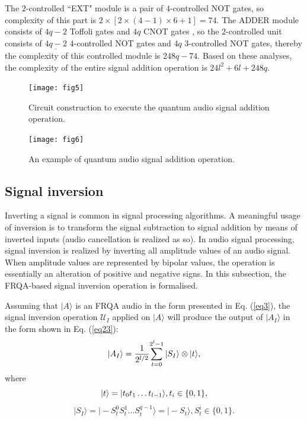 \documentclass[10pt,journal,compsoc]{IEEEtran}
\begin{document}
The $2$-controlled ``EXT" module is a pair of $4$-controlled NOT gates, so complexity of this part is $ 2 \times [2 \times (4-1) \times 6 + 1] = 74$. The ADDER module consists of $4q-2$ Toffoli gates and $4q$ CNOT gates \cite{16}, so the $2$-controlled unit consists of $\underline{4q-2}$ $4$-controlled NOT gates and $4q$ $3$-controlled NOT gates, thereby the complexity of this controlled module is $248q - 74$. Based on these analyses, the complexity of the entire signal addition operation is $24l^2 + 6l + 248q$.

\begin{figure}[!t]
\centering
\texttt{[image: fig5]}
\caption{Circuit construction to execute the quantum audio signal addition operation.}
\label{fig5}
\end{figure}
\begin{figure}[!t]
\centering
\texttt{[image: fig6]}
\caption{An example of quantum audio signal addition operation.}
\label{fig6}
\end{figure}

\subsection{Signal inversion}\label{sec3-2}
Inverting a signal is common in signal processing algorithms. A meaningful usage of inversion is to transform the signal subtraction to signal addition by means of inverted inputs (audio cancellation is realized as so). In audio signal processing, signal inversion is realized by inverting all amplitude values of an audio signal. When amplitude values are represented by bipolar values, the operation is essentially an alteration of positive and negative signs. In this subsection, the FRQA-based signal inversion operation is formalised.

Assuming that $\vert A \rangle$ is an FRQA audio in the form presented in Eq. (\ref{eq3}), the signal inversion operation $\mathcal{U}_I$ applied on $\vert A \rangle$ will produce the output of $\vert A_I \rangle$ in the form shown in Eq. (\ref{eq23}):
\begin{equation}\label{eq23}
\vert A_I \rangle = {1\over 2^{l/2}}{\sum_{t=0}^{2^{l} - 1}{\vert S_I\rangle}\otimes \vert t\rangle}, \notag
\end{equation}
where
\begin{equation}
\vert t \rangle = \vert t_0t_1\ldots t_{l-1} \rangle, t_i\in\{0, 1\}, \notag
\end{equation}
\begin{equation}
\vert S_I \rangle = \vert - S_t^0S_t^1\ldots S_t^{q-1} \rangle = \vert - S_t \rangle, S_t^i \in\{0, 1\}.
\end{equation}
\end{document}
